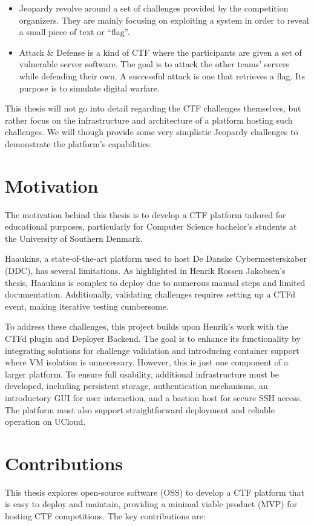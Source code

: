 \begin{itemize}
    \item Jeopardy revolve around a set of challenges provided by the competition organizers. They are mainly focusing on exploiting a system in order to reveal a small piece of text or ``flag''. 
    \item Attack \& Defense is a kind of CTF where the participants are given a set of vulnerable server software. The goal is to attack the other teams' servers while defending their own. A successful attack is one that retrieves a flag. Its purpose is to simulate digital warfare.
\end{itemize}

This thesis will not go into detail regarding the CTF challenges themselves, but rather focus on the infrastructure and architecture of a platform hosting such challenges. We will though provide some very simplistic Jeopardy challenges to demonstrate the platform's capabilities.

\section{Motivation}
The motivation behind this thesis is to develop a CTF platform tailored for educational purposes, particularly for Computer Science bachelor's students at the University of Southern Denmark.

Haaukins, a state-of-the-art platform used to host De Danske Cybermesterskaber (DDC), has several limitations. As highlighted in Henrik Rossen Jakobsen's thesis, Haaukins is complex to deploy due to numerous manual steps and limited documentation. Additionally, validating challenges requires setting up a CTFd event, making iterative testing cumbersome.

To address these challenges, this project builds upon Henrik's work with the CTFd plugin and Deployer Backend. The goal is to enhance its functionality by integrating solutions for challenge validation and introducing container support where VM isolation is unnecessary. However, this is just one component of a larger platform. To ensure full usability, additional infrastructure must be developed, including persistent storage, authentication mechanisms, an introductory GUI for user interaction, and a bastion host for secure SSH access. The platform must also support straightforward deployment and reliable operation on UCloud.

\section{Contributions}
This thesis explores open-source software (OSS) to develop a CTF platform that is easy to deploy and maintain, providing a minimal viable product (MVP) for hosting CTF competitions. The key contributions are:


